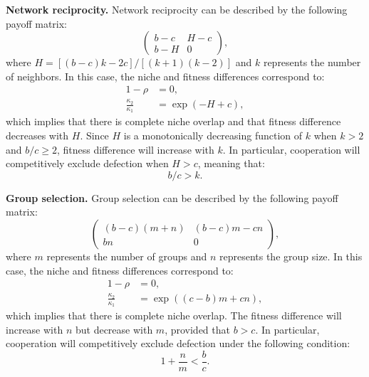 \documentclass[12pt]{article}
\begin{document}
\textbf{Network reciprocity.} Network reciprocity can be described by the following payoff matrix:
\begin{equation}
\begin{pmatrix}
b-c & H-c \\
b-H & 0
\end{pmatrix},
\end{equation}
where $H= [(b-c)k -2c]/[(k+1)(k-2)]$ and $k$ represents the number of neighbors. 
In this case, the niche and fitness differences correspond to:
\begin{align}
1-\rho &= 0,\\
\frac{\kappa_2}{\kappa_1} &= \exp\left(-H+c\right),
\end{align}
which implies that there is complete niche overlap and that fitness difference decreases with $H$.
Since $H$ is a monotonically decreasing function of $k$ when $k > 2$ and $b/c \geq 2$, fitness difference will increase with $k$.
In particular, cooperation will competitively exclude defection when $H>c$, meaning that:
\begin{equation}
b/c > k.
\end{equation}

\textbf{Group selection.} Group selection can be described by the following payoff matrix:
\begin{equation}
\begin{pmatrix}
(b-c)(m+n) & (b-c)m - cn \\
bn & 0
\end{pmatrix},
\end{equation}
where $m$ represents the number of groups and $n$ represents the group size.
In this case, the niche and fitness differences correspond to:
\begin{align}
1-\rho &= 0,\\
\frac{\kappa_2}{\kappa_1} &= \exp\left((c-b)m+cn \right),
\end{align}
which implies that there is complete niche overlap.
The fitness difference will increase with $n$ but decrease with $m$, provided that $b > c$.
In particular, cooperation will competitively exclude defection under the following condition:
\begin{equation}
1+ \frac{n}{m} < \frac{b}{c}.
\end{equation}


\end{document}
